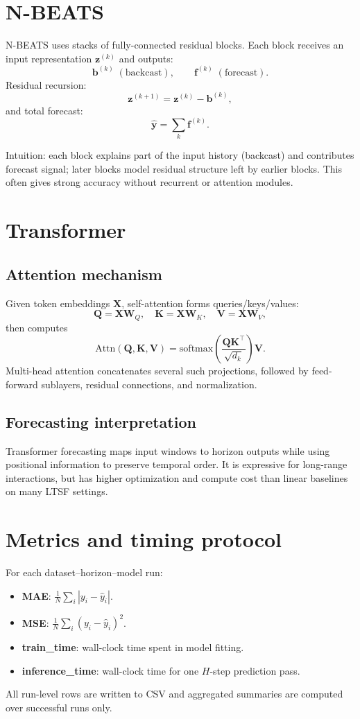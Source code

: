 \documentclass[11pt]{article}
\begin{document}
\section{N-BEATS}
N-BEATS uses stacks of fully-connected residual blocks. Each block receives an input representation $\mathbf{z}^{(k)}$ and outputs:
\[
\mathbf{b}^{(k)} \; (\text{backcast}),\qquad
\mathbf{f}^{(k)} \; (\text{forecast}).
\]
Residual recursion:
\[
\mathbf{z}^{(k+1)} = \mathbf{z}^{(k)} - \mathbf{b}^{(k)},
\]
and total forecast:
\[
\hat{\mathbf{y}} = \sum_k \mathbf{f}^{(k)}.
\]

Intuition: each block explains part of the input history (backcast) and contributes forecast signal; later blocks model residual structure left by earlier blocks. This often gives strong accuracy without recurrent or attention modules.

\section{Transformer}
\subsection{Attention mechanism}
Given token embeddings $\mathbf{X}$, self-attention forms queries/keys/values:
\[
\mathbf{Q}=\mathbf{X}\mathbf{W}_Q,\quad
\mathbf{K}=\mathbf{X}\mathbf{W}_K,\quad
\mathbf{V}=\mathbf{X}\mathbf{W}_V,
\]
then computes
\[
\mathrm{Attn}(\mathbf{Q},\mathbf{K},\mathbf{V})=\mathrm{softmax}\!\left(\frac{\mathbf{Q}\mathbf{K}^\top}{\sqrt{d_k}}\right)\mathbf{V}.
\]
Multi-head attention concatenates several such projections, followed by feed-forward sublayers, residual connections, and normalization.

\subsection{Forecasting interpretation}
Transformer forecasting maps input windows to horizon outputs while using positional information to preserve temporal order. It is expressive for long-range interactions, but has higher optimization and compute cost than linear baselines on many LTSF settings.

\section{Metrics and timing protocol}
For each dataset--horizon--model run:
\begin{itemize}
    \item \textbf{MAE}: $\frac{1}{N}\sum_i |y_i-\hat y_i|$.
    \item \textbf{MSE}: $\frac{1}{N}\sum_i (y_i-\hat y_i)^2$.
    \item \textbf{train\_time}: wall-clock time spent in model fitting.
    \item \textbf{inference\_time}: wall-clock time for one $H$-step prediction pass.
\end{itemize}
All run-level rows are written to CSV and aggregated summaries are computed over successful runs only.
\end{document}
